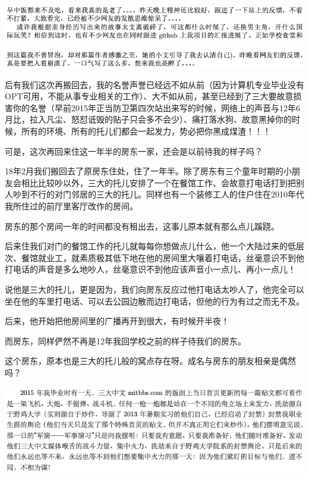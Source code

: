 \documentclass[9pt, b5paper]{article}
\begin{document}
\begin{center}
\includegraphics[width=.9\linewidth]{./pic/backups_plans_20210430_111323.png}
\end{center}

\begin{center}
\includegraphics[width=.9\linewidth]{./pic/backups_plans_20210430_111305.png}
\end{center}

后有我们这次再搬回去，我的名誉声誉已经远不如从前（因为计算机专业毕业没有OPT可用，不能从事专业相关的工作）、大不如从前，甚至已经到了三大要故意损害你的名誉（早前2015年正当防卫第四次站出来写的时候，网络上的声音与12年6月比，拉入凡尘、怒怼诋毁的贴子只会多不会少）、痛打落水狗、故意黑掉你的时候，所有的环境、所有的托儿们都会一起发力，势必把你黑成煤渣！！！

可是，这次再回来住这一年半的房东一家，还会是以前待我的样子吗？

18年2月我们搬回去了原房东住处，住了一年半。除了房东有三个童年时期的小朋友会相比比较吵以外，三大的托儿安排了一个在餐馆工作、会故意打电话打到把别人吵到不行的对门邻居的三大的托儿。同样也有一个装修工人的住户住在2010年代我所住过的前厅里客厅改作的房间。 

房东的那个房间一年的时间都没有租出去，这事儿原本就有那么点儿蹊跷。

后来住我们对门的餐馆工作的托儿就每每你想做点儿什么，他一个大陆过来的低层次、餐馆就业工，就素质极其低下地在他的房间里大嚷着打电话，丝毫意识不到他打电话的声音是多么地吵人，丝毫意识不到他应该声音小一点儿、再小一点儿！

说他是三大的托儿，更是因为，我们向房东反应过他打电话太吵人了，他完全可以坐在他的车里打电话、可以去公园边散而边打电话，但他的行为有过之而无不及。

后来，他开始把他房间里的广播再开到很大，有时候开半夜！

而房东，同样俨然不再是12年我回学校之前的样子待我们的房东。

这个房东，原本也是三大的托儿般的窝点存在呀。成名与房东的朋友相亲是偶然吗？

\begin{center}
\includegraphics[width=.9\linewidth]{./pic/backups_plans_20210430_113206.png}
\end{center}
\end{document}
